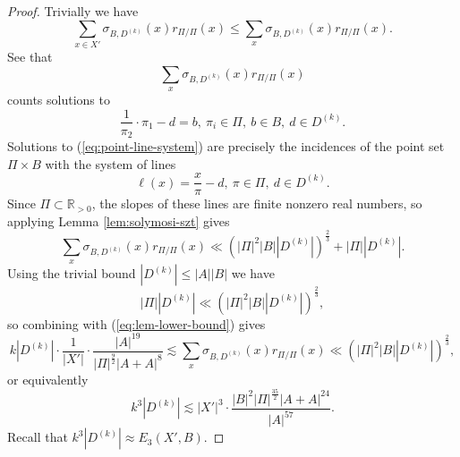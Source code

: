 \documentclass[10pt,a4paper]{amsart}
\begin{document}
\begin{proof}
Trivially we have
\[
    \sum _{x \in X'} \sigma_{B,D^{(k)}} (x) r_{ \Pi / \Pi} (x) \leq \sum _{x} \sigma_{B,D^{(k)}} (x) r_{ \Pi / \Pi} (x)
.\]
See that
\[
    \sum _{x} \sigma_{B,D^{(k)}} (x) r_{ \Pi / \Pi} (x)
\]
counts solutions to
\begin{equation} \label{eq:point-line-system}
    \frac{1}{\pi_2} \cdot \pi_1 - d = b,~ \pi_{i} \in \Pi,~ b \in B,~ d \in D^{(k)}.
\end{equation}
Solutions to (\ref{eq:point-line-system}) are precisely the incidences of the point set
\(\Pi \times B\) with the system of lines
\[
    \ell(x) = \frac{x}{\pi} - d ,~ \pi \in \Pi ,~ d \in D^{(k)}
.\]
Since \(\Pi \subset \mathbb{R} _{>0} \), the slopes of
these lines are finite nonzero real numbers, so applying Lemma \ref{lem:solymosi-szt} gives
\[
    \sum _{x} \sigma_{B,D^{(k)}} (x) r_{ \Pi / \Pi} (x) \ll \left( \left\lvert \Pi \right\rvert ^{2} \left\lvert B \right\rvert \left\lvert D^{(k)} \right\rvert  \right) ^{\frac{2}{3} } + \left\lvert \Pi \right\rvert \left\lvert D^{(k)} \right\rvert 
.\]
Using the trivial bound \(\left\lvert D^{(k)} \right\rvert \leq  \left\lvert A \right\rvert \left\lvert B \right\rvert \) we have
\[
    \left\lvert \Pi \right\rvert \left\lvert D^{(k)} \right\rvert \ll \left( \left\lvert \Pi \right\rvert ^{2} \left\lvert B \right\rvert \left\lvert D^{(k)} \right\rvert  \right) ^{\frac{2}{3} }
,\]
so combining with (\ref{eq:lem-lower-bound}) gives
\[
    k \left\lvert D^{(k)} \right\rvert \cdot \frac{1}{\left\lvert X' \right\rvert } \cdot \frac{\left\lvert A \right\rvert ^{19}}{\left\lvert \Pi \right\rvert ^{\frac{9}{2} } \left\lvert A + A \right\rvert ^{8}} \lesssim \sum _{x} \sigma_{B,D^{(k)}} (x) r_{ \Pi / \Pi} (x) \ll \left( \left\lvert \Pi \right\rvert ^{2} \left\lvert B \right\rvert \left\lvert D^{(k)} \right\rvert  \right) ^{\frac{2}{3} }
,\]
or equivalently
\[
    k^{3}  \left\lvert D^{(k)} \right\rvert \lesssim \left\lvert X' \right\rvert ^{3} \cdot \frac{\left\lvert B \right\rvert ^{2} \left\lvert \Pi \right\rvert ^{\frac{35}{2} }\left\lvert A+A \right\rvert ^{24}}{\left\lvert A \right\rvert ^{57}} 
.\]
Recall that \(k ^{3} \left\lvert D^{(k)} \right\rvert \approx E_3(X',B)\).


\end{proof}
\end{document}
